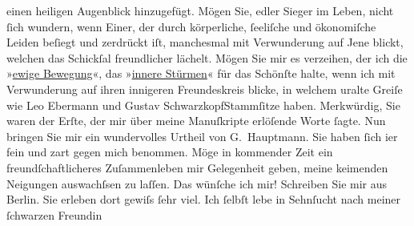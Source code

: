 \begin{ledgroupsized}[t]{13cm}
               einen heiligen Augenblick hinzugefügt.\pend
           \pstart
           Mögen Sie, edler Sieger im Leben, nicht ſich wundern, wenn Einer, der durch
               körperliche, ſeeliſche und ökonomiſche Leiden beſiegt und zerdrückt \introOben{}iſt\introOben{}, manchesmal mit Verwunderung auf Jene blickt, {\pb}welchen das Schickſal freundlicher
               lächelt. Mögen Sie mir es verzeihen, der ich die »\uline{ewige
                  Bewegung}«, das »\uline{innere Stürmen}« für das
               Schönſte halte, wenn ich mit Verwunderung auf ihren innigeren Freundeskreis blicke,
               in welchem uralte Greiſe wie Leo Ebermann und Gustav SchwarzkopfStammſitze haben.\pend
           \pstart
           Merkwürdig, Sie waren der Erſte, der mir über meine Manuſkripte erlöſende Worte
               ſagte. Nun bringen Sie mir ein wundervolles Urtheil{ }{\pb}von G. Hauptmann.\pend
           \pstart
           Sie haben ſich i{\geminationm}er fein und zart gegen mich
               benommen.\pend
           \pstart
           Möge in kommender Zeit ein freundſchaftlicheres
               Zuſammenleben mir Gelegenheit geben, meine keimenden Neigungen auswachſsen zu laſſen.
               Das wünſche ich mir!\pend
           \pstart
           Schreiben Sie mir aus Berlin. Sie erleben dort
               gewiſs ſehr viel. Ich ſelbſt lebe in Sehnſucht nach meiner ſchwarzen Freundin \label{K_L00612_1v}
\end{ledgroupsized}

